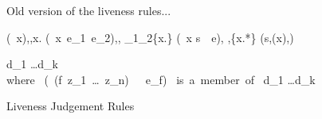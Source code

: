 \begin{figure}[t]
\footnotesize
Old version of the liveness rules...

        {(\RETURN~x),\sigma,\Lfonly \len  x.\sigma}
        {(\SIF~x~e_1~e_2),\sigma,\Lfonly \len
               \Lv_1\cup\Lv_2\cup \{x.\epsilon\}}
        {(\LET~x \leftarrow  s~\IN~e),
          \sigma,\Lfonly \len   \Lv\setminus \{x.*\} \cup
          (s,\Lv(x),\Lfonly)}


        { d_1 \ldots d_k \fen \Lfonly
\\ \mbox{where }
     (\DEFINE\ (f\ z_1\ \ldots\ z_n)\ \ \ e_f) \mbox{ is a member of }
        d_1 \ldots d_k}
\figrule
  \caption{Liveness Judgement Rules}\label{fig:live-judge-old}
\normalsize
\end{figure}



\newcommand{\dem}[1]{\psframebox[linestyle=none,fillstyle=none,fillcolor=lightgray]{\rule[-1pt]{0pt}{8pt}{\scriptsize $#1$}}\hspace*{1pt}}
\newcommand{\liv}[1]{\psframebox[linestyle=none,fillstyle=solid,fillcolor=lightgray]{\rule[-1pt]{0pt}{8pt}{\scriptsize $#1$}}\hspace*{1pt}}




